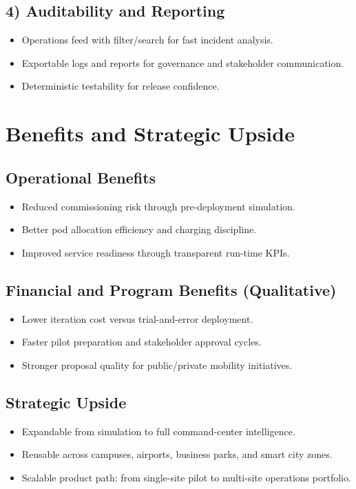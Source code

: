 \documentclass[11pt,a4paper]{article}
\begin{document}
\subsection*{4) Auditability and Reporting}
\begin{itemize}
  \item Operations feed with filter/search for fast incident analysis.
  \item Exportable logs and reports for governance and stakeholder communication.
  \item Deterministic testability for release confidence.
\end{itemize}

\section{Benefits and Strategic Upside}
\subsection*{Operational Benefits}
\begin{itemize}
  \item Reduced commissioning risk through pre-deployment simulation.
  \item Better pod allocation efficiency and charging discipline.
  \item Improved service readiness through transparent run-time KPIs.
\end{itemize}

\subsection*{Financial and Program Benefits (Qualitative)}
\begin{itemize}
  \item Lower iteration cost versus trial-and-error deployment.
  \item Faster pilot preparation and stakeholder approval cycles.
  \item Stronger proposal quality for public/private mobility initiatives.
\end{itemize}

\subsection*{Strategic Upside}
\begin{itemize}
  \item Expandable from simulation to full command-center intelligence.
  \item Reusable across campuses, airports, business parks, and smart city zones.
  \item Scalable product path: from single-site pilot to multi-site operations portfolio.
\end{itemize}
\end{document}
